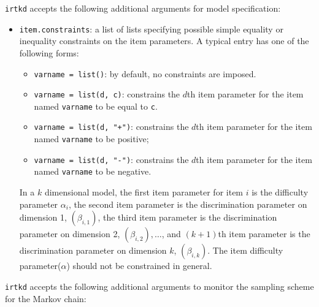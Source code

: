 \texttt{irtkd} accepts the following additional arguments for model specification:
\begin{itemize}
\item \texttt{item.constraints}: a list of lists specifying possible 
simple equality or inequality constraints on the item parameters.
A typical entry has one of the following forms: 
\begin{itemize}

\item {\tt varname = list()}: by default, no constraints are
imposed.

\item \texttt{varname = list(d, c)}: constrains the
$d$th item parameter for the item named \texttt{varname} to be equal
to \texttt{c}.

\item \texttt{varname = list(d, "+")}: constrains the
$d$th item parameter for the item  named \texttt{varname} to be positive;

\item \texttt{varname = list(d, "-")}: constrains the
$d$th item parameter for the item named \texttt{varname} to be negative.
\end{itemize} 
In a $k$ dimensional model, the first item parameter for item $i$ is
the difficulty parameter $\alpha_i$, the second item parameter is the
discrimination parameter on dimension 1, $(\beta_{i,1})$, the third
item parameter is the discrimination parameter on dimension 2,
$(\beta_{i,2}),\ldots$, and $(k+1)$th item parameter is the
discrimination parameter on dimension $k$, $(\beta_{i,k})$. The item
difficulty parameter($\alpha$) should not be constrained in general.
\end{itemize}

\noindent \texttt{irtkd} accepts the following additional arguments 
to monitor the sampling scheme for the Markov chain:

